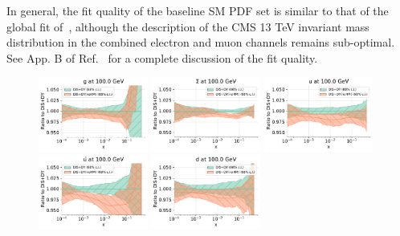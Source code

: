\documentclass[withindex,glossary]{cam-thesis}
\begin{document}
In general, the fit quality of the baseline SM PDF set
is similar to that of the global fit of~\cite{Faura:2020oom},
although the description of the CMS 13 TeV 
invariant mass distribution in the combined electron and muon 
channels remains sub-optimal. See App. B of Ref.~\cite{Greljo:2021kvv} for a complete discussion of the fit quality.

\begin{figure}[H]
  \centering
  \includegraphics[width=0.32\textwidth]{dy_figures/HDMY_Bases0_PDFRanges_DistPDFs_plot_pdfs_g.pdf}
  \includegraphics[width=0.32\textwidth]{dy_figures/HDMY_Bases0_PDFRanges_DistPDFs_plot_pdfs_Sigma.pdf}
  \includegraphics[width=0.32\textwidth]{dy_figures/HDMY_Bases1_PDFRanges_DistPDFs_plot_pdfs_u.pdf}
  \includegraphics[width=0.32\textwidth]{dy_figures/HDMY_Bases1_PDFRanges_DistPDFs_plot_pdfs_baru.pdf}
  \includegraphics[width=0.32\textwidth]{dy_figures/HDMY_Bases1_PDFRanges_DistPDFs_plot_pdfs_d.pdf}

\end{figure}
\end{document}

